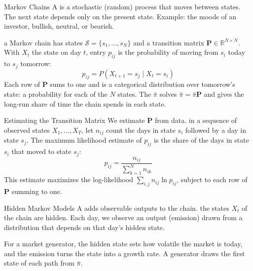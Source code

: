 \documentclass[aspectratio=169,11pt]{beamer}
\newcommand{\Sc}{\mathcal{S}}
\newcommand{\Pb}{\mathbf{P}}
\begin{document}
\begin{frame}{Markov Chains}
  A  is a stochastic (random) process that moves between states. The
  next state depends only on the present state. Example: the moods of an investor,
  bullish, neutral, or bearish.

  \vspace{0.5em}
  \textbf{} a Markov chain has states $\Sc=\{s_{1},\dotsc,s_{N}\}$ and a
  transition matrix $\Pb\in\mathbb{R}^{N\times{N}}$. With $X_{t}$ the state on day $t$, entry $p_{ij}$ is the
  probability of moving from $s_{i}$ today to $s_{j}$ tomorrow:
  \begin{equation*}
    p_{ij}=P\left(X_{t+1}=s_{j}\mid X_{t}=s_{i}\right)
  \end{equation*}
  Each row of $\Pb$ sums to one and is a categorical distribution over tomorrow's state:
  a probability for each of the $N$ states.
  The  $\bar{\pi}$ solves $\bar{\pi}=\bar{\pi}\Pb$ and gives
  the long-run share of time the chain spends in each state.
\end{frame}

\begin{frame}{Estimating the Transition Matrix}
  We estimate $\Pb$ from data. \textbf{} in a sequence of observed states
  $X_{1},\dotsc,X_{T}$, let $n_{ij}$ count the days in state $s_{i}$ followed by a day in
  state $s_{j}$. The maximum likelihood estimate of $p_{ij}$ is the share of the days in
  state $s_{i}$ that moved to state $s_{j}$:
  \begin{equation*}
    \boxed{\hat{p}_{ij}=\frac{n_{ij}}{\sum_{k=1}^{N}n_{ik}}}
  \end{equation*}
  This estimate maximizes the log-likelihood $\sum_{i,j}n_{ij}\ln p_{ij}$, subject to each
  row of $\Pb$ summing to one.
\end{frame}

\begin{frame}{Hidden Markov Models}
  A  adds observable outputs to the chain.
  \textbf{} the states $X_{t}$ of the chain are hidden. Each day, we observe
  an output (emission) drawn from a distribution that depends on that day's hidden state.

  \vspace{0.6em}
  For a market generator, the hidden state sets how volatile the market is today, and
  the emission turns the state into a growth rate. A generator draws the first state of
  each path from $\bar{\pi}$.
\end{frame}
\end{document}
